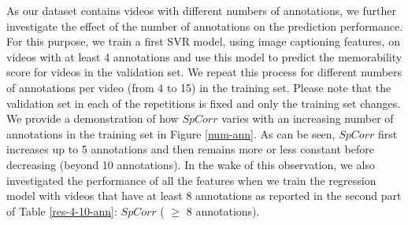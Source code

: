 \documentclass[sigconf]{acmart}
\begin{document}

As our dataset contains videos with different numbers of annotations, we further investigate the effect of the number of annotations on the prediction performance.
For this purpose, we train a first SVR model, using image captioning features, on videos with at least 4 annotations and use this model to predict the memorability score for videos in the validation set.
We repeat this process for different numbers of annotations per video (from 4 to 15) in the training set.
Please note that the validation set in each of the repetitions is fixed and only the training set changes.
We provide a demonstration of how $SpCorr$ varies with an increasing number of annotations in the training set in Figure \ref{num-ann}.
As can be seen, $SpCorr$ first increases up to 5 annotations and then remains more or less constant before decreasing (beyond 10 annotations).
In the wake of this observation, we also investigated the performance of all the features when we train the regression model with videos that have at least 8 annotations as reported in the second part of Table \ref{res-4-10-ann}: $SpCorr$ ( $\geq$ 8 annotations).
\end{document}
